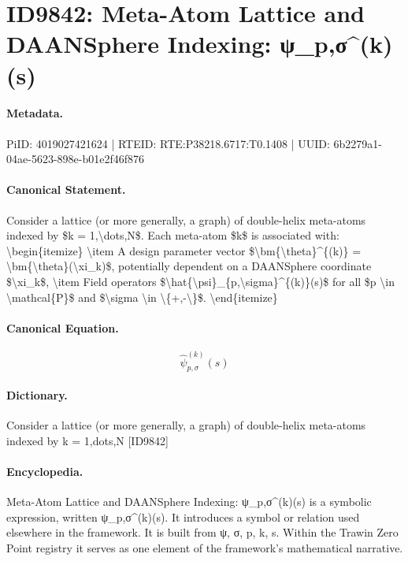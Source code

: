 \section*{ID9842: Meta-Atom Lattice and DAANSphere Indexing: ψ\_p,σ\textasciicircum{}(k)(s)}
\paragraph{Metadata.}
PiID: 4019027421624 | RTEID: RTE:P38218.6717:T0.1408 | UUID: 6b2279a1-04ae-5623-898e-b01e2f46f876

\paragraph{Canonical Statement.}
Consider a lattice (or more generally, a graph) of double-helix meta-atoms indexed by \$k = 1,\textbackslash{}dots,N\$. Each meta-atom \$k\$ is associated with: \textbackslash{}begin\{itemize\} \textbackslash{}item A design parameter vector \$\textbackslash{}bm\{\textbackslash{}theta\}\textasciicircum{}\{(k)\} = \textbackslash{}bm\{\textbackslash{}theta\}(\textbackslash{}xi\_k)\$, potentially dependent on a DAANSphere coordinate \$\textbackslash{}xi\_k\$, \textbackslash{}item Field operators \$\textbackslash{}hat\{\textbackslash{}psi\}\_\{p,\textbackslash{}sigma\}\textasciicircum{}\{(k)\}(s)\$ for all \$p \textbackslash{}in \textbackslash{}mathcal\{P\}\$ and \$\textbackslash{}sigma \textbackslash{}in \textbackslash{}\{+,-\textbackslash{}\}\$. \textbackslash{}end\{itemize\}

\paragraph{Canonical Equation.}
\[
\hat{\psi}_{p,\sigma}^{(k)}(s)
\]

\paragraph{Dictionary.}
Consider a lattice (or more generally, a graph) of double-helix meta-atoms indexed by k = 1,dots,N [ID9842]

\paragraph{Encyclopedia.}
Meta-Atom Lattice and DAANSphere Indexing: ψ\_p,σ\textasciicircum{}(k)(s) is a symbolic expression, written ψ\_p,σ\textasciicircum{}(k)(s). It introduces a symbol or relation used elsewhere in the framework. It is built from ψ, σ, p, k, s. Within the Trawin Zero Point registry it serves as one element of the framework's mathematical narrative.
